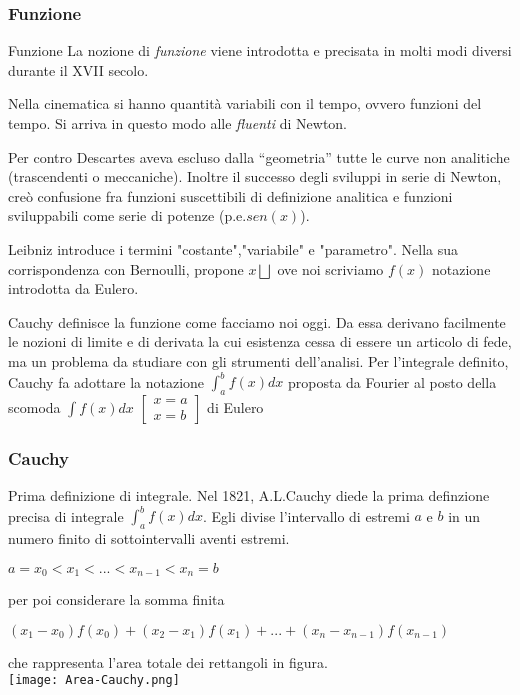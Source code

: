 \begin{frame}[label=Funzione]
  \frametitle{Funzione}
  \begin{block}{Funzione}    
  La nozione di \textit{funzione} viene introdotta e precisata in molti modi diversi
  durante il XVII secolo.

  Nella cinematica si hanno quantità variabili con il tempo, ovvero funzioni del tempo. 
  Si arriva in questo modo alle \textit{fluenti} di Newton.

  Per contro Descartes aveva escluso dalla ``geometria'' tutte le curve non analitiche (trascendenti o meccaniche).
  Inoltre il successo degli sviluppi in serie di Newton, creò confusione fra funzioni
  suscettibili di definizione analitica e funzioni sviluppabili come serie di potenze (p.e.$sen(x)$).  
  
  Leibniz introduce i termini "costante","variabile" e "parametro".
  Nella sua corrispondenza con Bernoulli, propone $x\bigsqcup$ ove noi scriviamo $f(x)$ notazione introdotta da Eulero.
  
  Cauchy definisce la funzione come facciamo noi oggi. Da essa derivano facilmente le nozioni di limite e di derivata la cui
  esistenza cessa di essere un articolo di fede, ma un problema da studiare con
  gli strumenti dell'analisi.
  Per l'integrale definito, Cauchy fa adottare la notazione $\int_{a}^bf(x)dx$ proposta da Fourier
  al posto della scomoda $\int f(x)dx$ $\left[\begin{array}{c} x=a \\ x=b \end{array}\right] $ di Eulero
  \end{block}  
\end{frame}

\begin{frame}[label=Cauchy]
  \frametitle{Cauchy}

  \begin{block}{Prima definizione di integrale.} 
    Nel 1821, A.L.Cauchy diede la prima definzione precisa di integrale 
    $\int_{a}^bf(x)dx$. Egli divise l'intervallo di estremi $a$ e $b$ 
    in un numero finito di sottointervalli aventi estremi.
    \begin{center}
      $a = x_0 < x_1 < ... < x_{n-1} < x_n = b$
    \end{center} 
    per poi considerare la somma finita
    \begin{center}
      $(x_1 - x_0)f(x_0) + (x_2-x_1)f(x_1) + ... + (x_n - x_{n-1})f(x_{n-1}) $
    \end{center}
    che rappresenta l'area totale dei rettangoli in figura.\\
    \texttt{[image: Area-Cauchy.png]}
  \end{block}
\end{frame}

